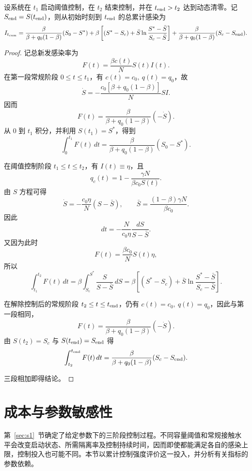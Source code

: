 \documentclass[lang=cn,a4paper,newtx]{elegantpaper}
\numberwithin{equation}{section}
\theoremstyle{plain}
\newcommand{\Itcum}{I_{t_{\mathrm{cum}}}}
\begin{document}
\begin{theorem}\label{thm:s1:Itcum}
    设系统在 $t_1$ 启动阈值控制，在 $t_2$ 结束控制，并在 $t_{\rm end}>t_2$ 达到动态清零。记 $S_{\rm end}=S(t_{\rm end})$，则从初始时刻到 $t_{\rm end}$ 的总累计感染为
    \[
    \Itcum
    =
    \frac{\beta}{\beta+q_0(1-\beta)}(S_0-S^*)
    +
    \beta\left[
    (S^*-S_c)+\bar S\ln\frac{S^*-\bar S}{S_c-\bar S}
    \right]
    +
    \frac{\beta}{\beta+q_0(1-\beta)}(S_c-S_{\rm end}).
    \]
\end{theorem}
\begin{proof}
    记总新发感染率为
    \[
    F(t)=\frac{\beta c(t)}{N}S(t)I(t).
    \]
    在第一段常规阶段 $0\le t\le t_1$，有 $c(t)=c_0,\ q(t)=q_0$，故
    \[
    \dot S
    =
    -\frac{c_0[\beta+q_0(1-\beta)]}{N}SI.
    \]
    因而
    \[
    F(t)
    =
    \frac{\beta}{\beta+q_0(1-\beta)}(-\dot S).
    \]
    从 $0$ 到 $t_1$ 积分，并利用 $S(t_1)=S^*$，得到
    \[
    \int_0^{t_1}F(t)\,dt
    =
    \frac{\beta}{\beta+q_0(1-\beta)}(S_0-S^*).
    \]

    在阈值控制阶段 $t_1\le t\le t_2$，有 $I(t)\equiv\eta$，且
    \[
    q_c(t)=1-\frac{\gamma N}{\beta c_0S(t)}.
    \]
    由 $S$ 方程可得
    \[
    \dot S
    =
    -\frac{c_0\eta}{N}(S-\bar S),
    \qquad
    \bar S=\frac{(1-\beta)\gamma N}{\beta c_0}.
    \]
    因此
    \[
    dt
    =
    -\frac{N}{c_0\eta}\frac{dS}{S-\bar S}.
    \]
    又因为此时
    \[
    F(t)=\frac{\beta c_0}{N}S(t)\eta,
    \]
    所以
    \[
    \int_{t_1}^{t_2}F(t)\,dt
    =
    \beta\int_{S_c}^{S^*}\frac{S}{S-\bar S}\,dS
    =
    \beta\left[
    (S^*-S_c)+\bar S\ln\frac{S^*-\bar S}{S_c-\bar S}
    \right].
    \]

    在解除控制后的常规阶段 $t_2\le t\le t_{\rm end}$，仍有
    $c(t)=c_0,\ q(t)=q_0$，因此与第一段相同，
    \[
    F(t)
    =
    \frac{\beta}{\beta+q_0(1-\beta)}(-\dot S).
    \]
    由 $S(t_2)=S_c$ 与 $S(t_{\rm end})=S_{\rm end}$ 得
    \[
    \int_{t_2}^{t_{\rm end}}F(t)\,dt
    =
    \frac{\beta}{\beta+q_0(1-\beta)}(S_c-S_{\rm end}).
    \]

    三段相加即得结论。
\end{proof}

\section{成本与参数敏感性}
\label{sec:cost}
第~\ref{sec:s1}~节确定了给定参数下的三阶段控制过程。不同容量阈值和常规接触水平会改变启动状态、所需隔离率及控制持续时间，因而即使都能满足各自的感染上限，控制投入也可能不同。本节以累计控制强度评价这一投入，并分析有关指标的参数依赖。
\end{document}
